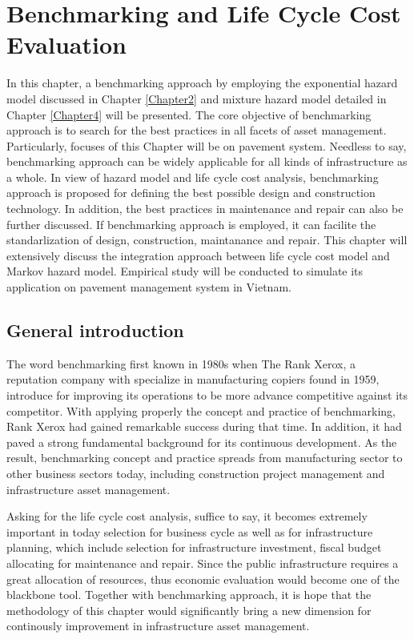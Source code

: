 \chapter{Benchmarking and Life Cycle Cost Evaluation} %
\label{Chapter6}
In this chapter, a benchmarking approach by employing the exponential hazard model discussed in Chapter \ref{Chapter2} and mixture hazard model detailed in Chapter \ref{Chapter4} will be presented. The core objective of benchmarking approach is to search for the best practices in all facets of asset management. Particularly, focuses of this Chapter will be on pavement system. Needless to say, benchmarking approach can be widely applicable for all kinds of infrastructure as a whole. In view of hazard model and life cycle cost analysis, benchmarking approach is proposed for defining the best possible design and construction technology. In addition, the best practices in maintenance and repair can also be further discussed. If benchmarking approach is employed, it can facilite the standarlization of design, construction, maintanance and repair. This chapter will extensively discuss the integration approach between life cycle cost model and Markov hazard model. Empirical study will be conducted to simulate its application on pavement management system in Vietnam.
\section{General introduction}
\label{61}
The word benchmarking first known in 1980s when The Rank Xerox, a reputation company with specialize in manufacturing copiers found in 1959, introduce for improving its operations to be more advance competitive against its competitor. With applying properly the concept and practice of benchmarking, Rank Xerox had gained remarkable success during that time. In addition, it had paved a strong fundamental background for its continuous development. As the result, benchmarking concept and practice spreads from manufacturing sector to other business sectors today, including construction project management and infrastructure asset management.

Asking for the life cycle cost analysis, suffice to say, it becomes extremely important in today selection for business cycle as well as for infrastructure planning, which include selection for infrastructure investment, fiscal budget allocating for maintenance and repair. Since the public infrastructure requires a great allocation of resources, thus economic evaluation would become one of the blackbone tool. Together with benchmarking approach, it is hope that the methodology of this chapter would significantly bring a new dimension for continously improvement in infrastructure asset management.

